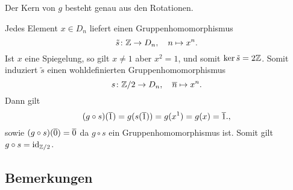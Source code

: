 \subsection{}

Der Kern von $g$ besteht genau aus den Rotationen.

Jedes Element $x \in D_n$ liefert einen Gruppenhomomorphismus
\[
          \tilde{s}
  \colon  \mathbb{Z}
  \to     D_n,
  \quad   n
  \mapsto x^n.
\]
Ist $x$ eine Spiegelung, so gilt $x \neq 1$ aber $x^2 = 1$, und somit $\ker \tilde{s} = 2\mathbb{Z}$.
Somit induziert $\tilde{s}$ einen wohldefinierten Gruppenhomomorphismus
\[
          s
  \colon  \mathbb{Z}/2
  \to     D_n,
  \quad   \overline{n}
  \mapsto x^n.
\]
Dann gilt
\[
    (g \circ s)(\overline{1})
  = g(s(\overline{1}))
  = g(x^1)
  = g(x)
  = \overline{1}.,
\]
sowie $(g \circ s)(\overline{0}) = \overline{0}$ da $g \circ s$ ein Gruppenhomomorphismus ist.
Somit gilt $g \circ s = \operatorname{id}_{\mathbb{Z}/2}$.





\subsection*{Bemerkungen}

